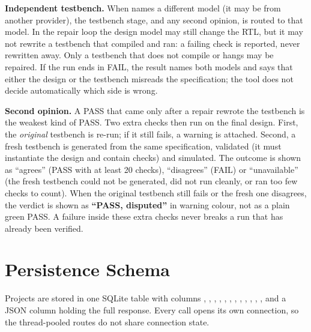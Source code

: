 \textbf{Independent testbench.} When  names a different model
(it may be from another provider), the testbench stage, and any second opinion, is
routed to that model. In the repair loop the design model may still change the RTL,
but it may not rewrite a testbench that compiled and ran: a failing check is
reported, never rewritten away. Only a testbench that does not compile or hangs may
be repaired. If the run ends in FAIL, the result names both models and says that
either the design or the testbench misreads the specification; the tool does not
decide automatically which side is wrong.

\textbf{Second opinion.} A PASS that came only after a repair rewrote the testbench is
the weakest kind of PASS. Two extra checks then run on the final design. First, the
\emph{original} testbench is re-run; if it still fails, a warning is attached.
Second, a fresh testbench is generated from the same specification, validated (it
must instantiate the design and contain checks) and simulated. The outcome is shown
as ``agrees'' (PASS with at least 20 checks), ``disagrees'' (FAIL) or
``unavailable'' (the fresh testbench could not be generated, did not run cleanly, or ran
too few checks to count). When the original testbench still fails or the fresh one
disagrees, the verdict is shown as \textbf{``PASS, disputed''} in warning colour, not as
a plain green PASS.
A failure inside these extra checks never breaks a run that has already been verified.

\section{Persistence Schema}
Projects are stored in one SQLite table with columns , , , , , , , , , , , ,  and a JSON  column holding the full response. Every call opens its own connection, so the thread-pooled routes do not share connection state.

